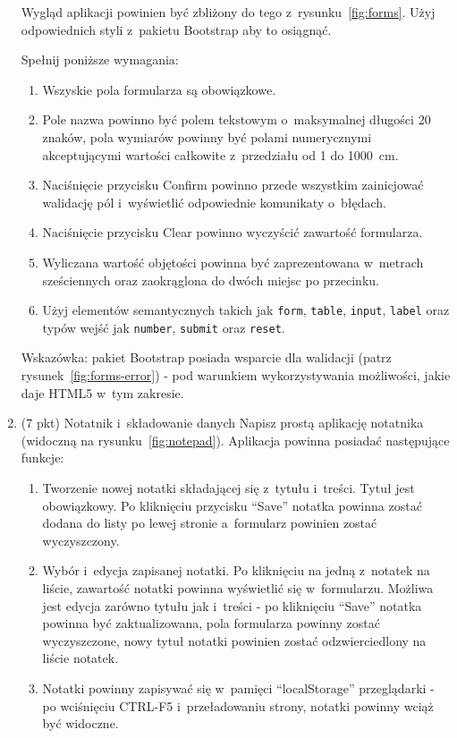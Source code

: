 \documentclass[12pt]{article}
\begin{document}
\begin{enumerate}
            Wygląd aplikacji powinien być zbliżony do tego z~rysunku~\ref{fig:forms}.
            Użyj odpowiednich styli z~pakietu Bootstrap aby to osiągnąć.

            Spełnij poniższe wymagania:
            \begin{enumerate}
                \item Wszyskie pola formularza są obowiązkowe.
                \item Pole nazwa powinno być polem tekstowym o~maksymalnej długości 20 znaków, pola wymiarów powinny być polami numerycznymi akceptującymi wartości całkowite z~przedziału od 1 do 1000~cm.
                \item Naciśnięcie przycisku Confirm powinno przede wszystkim zainicjować walidację pól i~wyświetlić odpowiednie komunikaty o~błędach.
                \item Naciśnięcie przycisku Clear powinno wyczyścić zawartość formularza.
                \item Wyliczana wartość objętości powinna być zaprezentowana w~metrach sześciennych oraz zaokrąglona do dwóch miejsc po przecinku.
                \item Użyj elementów semantycznych takich jak \texttt{form}, \texttt{table}, \texttt{input}, \texttt{label} oraz typów wejść jak \texttt{number}, \texttt{submit} oraz \texttt{reset}.
            \end{enumerate}

            Wskazówka: pakiet Bootstrap posiada wsparcie dla walidacji (patrz rysunek~\ref{fig:forms-error}) - pod warunkiem wykorzystywania możliwości, jakie daje HTML5 w~tym zakresie.

            \item\label{exc:notepad}
            (7 pkt) Notatnik i~składowanie danych
            Napisz prostą aplikację notatnika (widoczną na rysunku~\ref{fig:notepad}).
            Aplikacja powinna posiadać następujące funkcje:
            \begin{enumerate}
                \item Tworzenie nowej notatki składającej się z~tytułu i~treści. Tytuł jest obowiązkowy. Po kliknięciu przycisku ``Save'' notatka powinna zostać dodana do listy po lewej stronie a~formularz powinien zostać wyczyszczony.
                \item Wybór i~edycja zapisanej notatki. Po kliknięciu na jedną z~notatek na liście, zawartość notatki powinna wyświetlić się w~formularzu. Możliwa jest edycja zarówno tytułu jak i~treści - po kliknięciu ``Save'' notatka powinna być zaktualizowana, pola formularza powinny zostać wyczyszczone, nowy tytuł notatki powinien zostać odzwierciedlony na liście notatek.
                \item Notatki powinny zapisywać się w~pamięci ``localStorage'' przeglądarki - po wciśnięciu CTRL-F5 i~przeładowaniu strony, notatki powinny wciąż być widoczne.
            \end{enumerate}


\end{enumerate}
\end{document}

